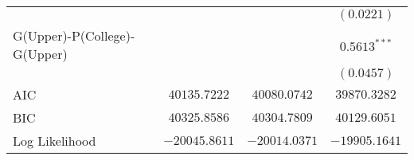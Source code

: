 \begin{center}
\begin{longtable}{l c c c}
                                 &                 &                & $(0.0221)$      \\
G(Upper)-P(College)-G(Upper)     &                 &                & $0.5613^{***}$  \\
                                 &                 &                & $(0.0457)$      \\
\midrule
AIC                              & $40135.7222$    & $40080.0742$   & $39870.3282$    \\
BIC                              & $40325.8586$    & $40304.7809$   & $40129.6051$    \\
Log Likelihood                   & $-20045.8611$   & $-20014.0371$  & $-19905.1641$   \\
\end{longtable}
\end{center}
